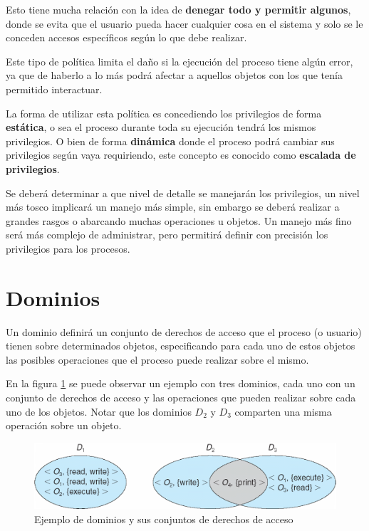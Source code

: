 Esto tiene mucha relación con la idea de \textbf{denegar todo y permitir
algunos}, donde se evita que el usuario pueda hacer cualquier cosa en el sistema
y solo se le conceden accesos específicos según lo que debe realizar.

Este tipo de política limita el daño si la ejecución del proceso tiene algún
error, ya que de haberlo a lo más podrá afectar a aquellos objetos con los que
tenía permitido interactuar.

La forma de utilizar esta política es concediendo los privilegios de forma
\textbf{estática}, o sea el proceso durante toda su ejecución tendrá los mismos
privilegios. O bien de forma \textbf{dinámica} donde el proceso podrá cambiar
sus privilegios según vaya requiriendo, este concepto es conocido como
\textbf{escalada de privilegios}.

Se deberá determinar a que nivel de detalle se manejarán los privilegios, un
nivel más tosco implicará un manejo más simple, sin embargo se deberá realizar a
grandes rasgos o abarcando muchas operaciones u objetos. Un manejo más fino será
más complejo de administrar, pero permitirá definir con precisión los
privilegios para los procesos.

\section{Dominios}
Un dominio definirá un conjunto de derechos de acceso que el proceso (o usuario)
tienen sobre determinados objetos, especificando para cada uno de estos objetos
las posibles operaciones que el proceso puede realizar sobre el mismo.

En la figura \ref{fig:proteccion_dominios} se puede observar un ejemplo con tres
dominios, cada uno con un conjunto de derechos de acceso y las operaciones que
pueden realizar sobre cada uno de los objetos. Notar que los dominios $D_2$ y
$D_3$ comparten una misma operación sobre un objeto.

\begin{figure}[htbp]
\centering
\includegraphics[scale=0.6]{img/C09_proteccion/dominios.png}
\caption{Ejemplo de dominios y sus conjuntos de derechos de acceso}
\label{fig:proteccion_dominios}
\end{figure}

